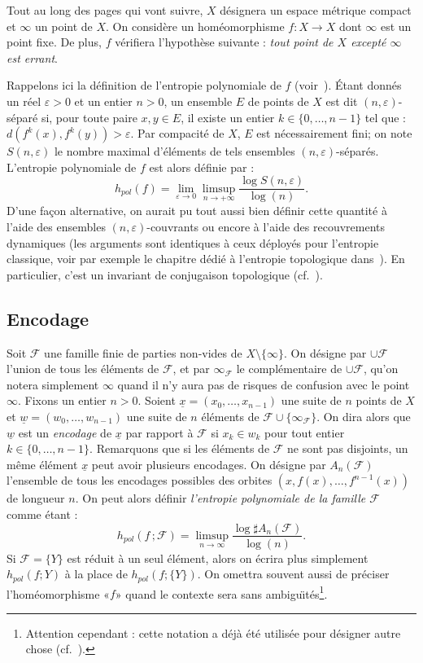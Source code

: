 \documentclass[11pt]{article}
\providecommand{\og}{«\nobreakspace}
\providecommand{\fg}{\nobreakspace»}
\theoremstyle{definition}
\numberwithin{equation}{section}
\numberwithin{figure}{section}
\numberwithin{table}{section}
\newcommand*\cF{{\mathcal F}}
\begin{document}

Tout au long des pages qui vont suivre, $X$ désignera un espace métrique compact et $\infty$ un point de $X$. On considère un homéomorphisme $f:X \to X$ dont $\infty$ est un point fixe. De plus, $f$ vérifiera l'hypothèse suivante : \emph{tout point de $X$ excepté $\infty$ est errant}.

Rappelons ici la définition de l'entropie polynomiale de $f$ (voir~\cite{Mar13}). \'Etant donnés un réel $\varepsilon>0$ et un entier $n > 0$, un ensemble $E$ de points de $X$ est dit $(n,\varepsilon)$-séparé si, pour toute paire $x,y \in E$, il existe un entier $k \in \{0, \dots, n-1\}$ tel que : $d(f^k(x), f^k(y))>\varepsilon$. Par compacité de $X$, $E$ est nécessairement fini; on note $S(n,\varepsilon)$ le nombre maximal d'éléments de tels ensembles $(n,\varepsilon)$-séparés. L'entropie polynomiale de $f$ est alors définie par :
\[
h_{pol}(f) = \lim_{\varepsilon \to 0} \limsup_{n \to +\infty} \frac{\log S(n,\varepsilon)}{\log (n)}.
\]
D'une façon alternative, on aurait pu tout aussi bien définir cette quantité
à l'aide des ensembles $(n,\varepsilon)$-couvrants ou encore à l'aide des recouvrements dynamiques (les arguments sont identiques à ceux déployés pour l'entropie classique, voir par exemple le chapitre dédié à l'entropie topologique dans~\cite{Wal82}). En particulier, c'est un invariant de conjugaison topologique (cf.~\cite{Mar13}).

\subsection{Encodage}\label{ss.coding}

Soit $\cF$ une famille finie de parties non-vides de $X \setminus \{\infty\}$. On désigne par $\cup \cF$ l'union de tous les éléments de $\cF$, et par $\infty_\cF$ le complémentaire de $\cup \cF$, qu'on notera simplement $\infty$ quand il n'y aura pas de risques de confusion avec le point $\infty$. Fixons un entier $n>0$. Soient $\underline{x} = (x_{0}, \dots, x_{n-1})$ une suite de $n$ points de $X$ et $\underline{w} = (w_0, \dots, w_{n-1})$ une suite de $n$ éléments de $\cF\cup\{\infty_\cF\}$. On dira alors que $\underline{w}$ est un \emph{encodage} de $\underline{x}$ par rapport à $\cF$ si $x_{k} \in w_k$ pour tout entier $k \in \{0, \dots, n-1\}$. Remarquons que si les éléments de $\cF$ ne sont pas disjoints, un même élément $\underline{x}$ peut avoir plusieurs encodages. On désigne par $A_{n}(\cF)$ l'ensemble de tous les encodages possibles des orbites $(x, f(x), \dots, f^{n-1}(x))$ de longueur $n$. On peut alors définir \emph{l'entropie polynomiale de la famille $\cF$} comme étant :
\[
h_{pol}(f \,; \cF) = \limsup_{n \to \infty} \frac{\log \sharp A_{n}(\cF)}{\log (n)}.
\]
Si $\cF = \{Y\}$ est réduit à un seul élément, alors on écrira plus simplement $h_{pol}(f; Y)$ à la place de $h_{pol}(f; \{Y\})$. On omettra souvent aussi de préciser l'homéomorphisme \og $f$\fg{} quand le contexte sera sans ambigu\"{\i}tés\footnote{Attention cependant : cette notation a déjà été utilisée pour désigner autre chose (cf.~\cite[définition~1]{Mar13}).}.
\end{document}
